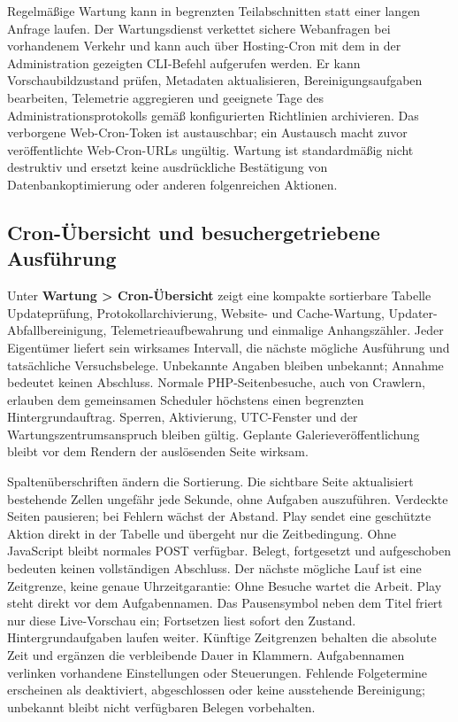 \documentclass[11pt,a4paper]{article}
\newcommand{\ui}[1]{\textbf{#1}}
\begin{document}
Regelmäßige Wartung kann in begrenzten Teilabschnitten statt einer langen
Anfrage laufen. Der Wartungsdienst verkettet sichere Webanfragen bei vorhandenem
Verkehr und kann auch über Hosting-Cron mit dem in der Administration gezeigten
CLI-Befehl aufgerufen werden. Er kann Vorschaubildzustand prüfen, Metadaten
aktualisieren, Bereinigungsaufgaben bearbeiten, Telemetrie aggregieren und
geeignete Tage des Administrationsprotokolls gemäß konfigurierten Richtlinien
archivieren. Das verborgene Web-Cron-Token ist austauschbar; ein Austausch macht
zuvor veröffentlichte Web-Cron-URLs ungültig. Wartung ist standardmäßig nicht
destruktiv und ersetzt keine ausdrückliche Bestätigung von Datenbankoptimierung
oder anderen folgenreichen Aktionen.
\subsection{Cron-Übersicht und besuchergetriebene Ausführung}
Unter \ui{Wartung > Cron-Übersicht} zeigt eine kompakte sortierbare Tabelle
Updateprüfung, Protokollarchivierung, Website- und Cache-Wartung,
Updater-Abfallbereinigung, Telemetrieaufbewahrung und einmalige Anhangszähler.
Jeder Eigentümer liefert sein wirksames Intervall, die nächste mögliche
Ausführung und tatsächliche Versuchsbelege. Unbekannte Angaben bleiben
unbekannt; Annahme bedeutet keinen Abschluss. Normale PHP-Seitenbesuche,
auch von Crawlern, erlauben dem gemeinsamen Scheduler höchstens einen
begrenzten Hintergrundauftrag. Sperren, Aktivierung, UTC-Fenster und der
Wartungszentrumsanspruch bleiben gültig. Geplante Galerieveröffentlichung
bleibt vor dem Rendern der auslösenden Seite wirksam.

Spaltenüberschriften ändern die Sortierung. Die sichtbare Seite aktualisiert
bestehende Zellen ungefähr jede Sekunde, ohne Aufgaben auszuführen. Verdeckte
Seiten pausieren; bei Fehlern wächst der Abstand. Play sendet eine geschützte
Aktion direkt in der Tabelle und übergeht nur die Zeitbedingung. Ohne JavaScript
bleibt normales POST verfügbar. Belegt, fortgesetzt und aufgeschoben bedeuten
keinen vollständigen Abschluss. Der nächste mögliche Lauf ist eine Zeitgrenze,
keine genaue Uhrzeitgarantie: Ohne Besuche wartet die Arbeit.
Play steht direkt vor dem Aufgabennamen. Das Pausensymbol neben dem Titel
friert nur diese Live-Vorschau ein; Fortsetzen liest sofort den Zustand.
Hintergrundaufgaben laufen weiter. Künftige Zeitgrenzen behalten die absolute
Zeit und ergänzen die verbleibende Dauer in Klammern.
Aufgabennamen verlinken vorhandene Einstellungen oder Steuerungen. Fehlende
Folgetermine erscheinen als deaktiviert, abgeschlossen oder keine ausstehende
Bereinigung; unbekannt bleibt nicht verfügbaren Belegen vorbehalten.
\end{document}
